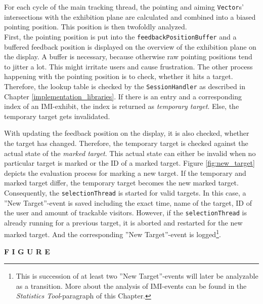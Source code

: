 For each cycle of the main tracking thread, the pointing and aiming \texttt{Vector}s' intersections with the exhibition plane are calculated and combined into a biased pointing position. This position is then twofoldly analyzed.
\\
First, the pointing position is put into the \texttt{feedbackPositionBuffer} and a buffered feedback position is displayed on the overview of the exhibition plane on the display. A buffer is necessary, because otherwise raw pointing positions tend to jitter a lot. This might irritate users and cause frustration. 
The other process happening with the pointing position is to check, whether it hits a target. Therefore, the lookup table is checked by the \texttt{SessionHandler} as described in Chapter \ref{implementation_libraries}. If there is an entry and a corresponding index of an \ac{IMI}-exhibit, the index is returned as \textit{temporary target}. Else, the temporary target gets invalidated.

With updating the feedback position on the display, it is also checked, whether the target has changed. Therefore, the temporary target is checked against the actual state of the \textit{marked target}. This actual state can either be invalid when no particular target is marked or the \ac{ID} of a marked target. Figure \ref{fig:new_target} depicts the evaluation process for marking a new target. If the temporary and marked target differ, the temporary target becomes the new marked target. Consequently, the \texttt{selectionThread} is started for valid targets. In this case, a ''New Target''-event is saved including the exact time, name of the target, ID of the user and amount of trackable visitors. However, if the \texttt{selectionThread} is already running for a previous target, it is aborted and restarted for the new marked target. And the corresponding ''New Target''-event is logged\footnote{This is succession of at least two ''New Target''-events will later be analyzable as a transition. More about the analysis of \ac{IMI}-events can be found in the \textit{Statistics Tool}-paragraph of this Chapter.}.  

\textbf{F I G U R E}

